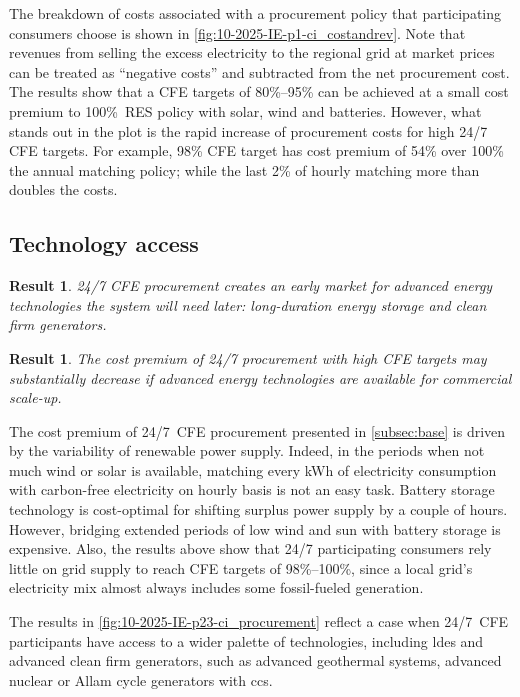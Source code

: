 \documentclass[11pt, 5p, nopreprintline]{elsarticle}
\newtheorem{res}[thm]{Result}  %
\begin{document}
The breakdown of costs associated with a procurement policy that participating consumers choose is shown in \cref{fig:10-2025-IE-p1-ci_costandrev}.
Note that revenues from selling the excess electricity to the regional grid at market prices can be treated as \enquote{negative costs} and subtracted from the net procurement cost.
The results show that a CFE targets of 80\%--95\% can be achieved at a small cost premium to 100\%~RES policy with solar, wind and batteries.
However, what stands out in the plot is the rapid increase of procurement costs for high 24/7 CFE targets.
For example, 98\% CFE target has cost premium of 54\% over 100\% the annual matching policy; while the last 2\% of hourly matching more than doubles the costs.


\subsection{Technology access}
\label{subsec:palette}

\begin{res}
    24/7 CFE procurement creates an early market for advanced energy technologies the system will need later: long-duration energy storage and clean firm generators.
\end{res}

\begin{res}
    The cost premium of 24/7 procurement with high CFE targets may substantially decrease if advanced energy technologies are available for commercial scale-up.
\end{res}

The cost premium of 24/7~CFE procurement presented in \cref{subsec:base} is driven by the variability of renewable power supply.
Indeed, in the periods when not much wind or solar is available, matching every kWh of electricity consumption with carbon-free electricity on hourly basis is not an easy task.
Battery storage technology is cost-optimal for shifting surplus power supply by a couple of hours.
However, bridging extended periods of low wind and sun with battery storage is expensive.
Also, the results above show that 24/7 participating consumers rely little on grid supply to reach CFE targets of 98\%--100\%, since a local grid's electricity mix almost always includes some fossil-fueled generation.

The results in \cref{fig:10-2025-IE-p23-ci_procurement} reflect a case when 24/7~CFE participants have access to a wider palette of technologies, including \gls{ldes} and advanced clean firm generators, such as advanced geothermal systems, advanced nuclear or Allam cycle generators with \gls{ccs}.
\end{document}
